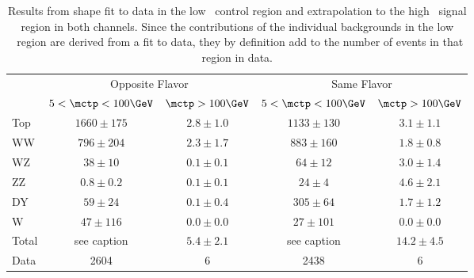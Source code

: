 \begin{table}
    \begin{center}
    \caption{Results from shape fit to data in the low \mctp\ control region and extrapolation to the high \mctp\ signal region in both channels. Since the contributions of the individual backgrounds in the low \mctp\ region are derived from a fit to data, they by definition add to the number of events in that region in data.}
    \label{tab:fit}
    \begin{tabular}{l|c|c|c|c}
        & \multicolumn{2}{c|}{Opposite Flavor} & \multicolumn{2}{c}{Same Flavor}\\
         & \textbf{$5 < \mctp < 100 \GeV$} & \textbf{$\mctp > 100 \GeV$} & \textbf{$5 < \mctp < 100 \GeV$} & \textbf{$\mctp > 100 \GeV$}\\
         \hline
Top & $1660\pm175$ & $2.8\pm1.0$& $1133\pm130$& $3.1\pm1.1$\\
WW &  $796\pm204$ & $2.3\pm1.7$& $883\pm160$& $1.8\pm0.8$\\
WZ &  $38\pm10$ & $0.1\pm0.1$& $64\pm12$& $3.0\pm1.4$\\
ZZ &  $0.8\pm0.2$ & $0.1\pm0.1$& $24\pm4$& $4.6\pm2.1$\\
DY &  $59\pm24$ & $0.1\pm0.4$& $305\pm64$& $1.7\pm1.2$\\
W &   $47\pm116$ & $0.0\pm0.0$& $27\pm101$& $0.0\pm0.0$\\
\hline
Total & see caption & $5.4\pm2.1$ & see caption & $14.2\pm4.5$\\
\hline
\hline
Data & 2604 & 6 & 2438 & 6\\
    \end{tabular}
    \end{center}
\end{table}
